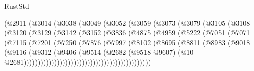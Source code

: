 \begin{lexlean}{RustStd}
\begin{coremodule}
                        (@2911
                          (@3014
                            (@3038
                              (@3049
                                (@3052
                                  (@3059
                                    (@3073
                                      (@3079
                                        (@3105
                                          (@3108
                                            (@3120
                                              (@3129
                                                (@3142
                                                  (@3152
                                                    (@3836
                                                      (@4875
                                                        (@4959
                                                          (@5222
                                                            (@7051
                                                              (@7071
                                                                (@7115
                                                                  (@7201
                                                                    (@7250
                                                                      (@7876
                                                                        (@7997
                                                                          (@8102
                                                                            (@8695
                                                                              (@8811
                                                                                (@8983
                                                                                  (@9018
                                                                                    (@9116
                                                                                      (@9312
                                                                                        (@9406
                                                                                          (@9514
                                                                                            (@2682
                                                                                              (@9518
                                                                                                @9607)
                                                                                              (@10
                                                                                                @2681))))))))))))))))))))))))))))))))))))))))))))))

\end{coremodule}
\end{lexlean}
